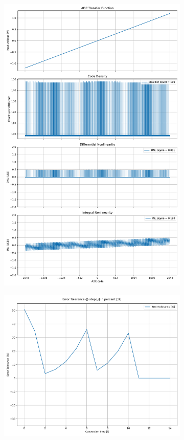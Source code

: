 \documentclass[varwidth]{standalone}
\begin{document}
\begin{figure}
\begin{subfigure}{0.32\textwidth}
    \includegraphics[width=\textwidth]{12b_caeleste_nonlinearity.pdf}
\end{subfigure}
\begin{subfigure}{0.32\textwidth}
    \includegraphics[width=\textwidth]{12b_caeleste_redundancy.pdf}

\end{subfigure}
\end{figure}
\end{document}
